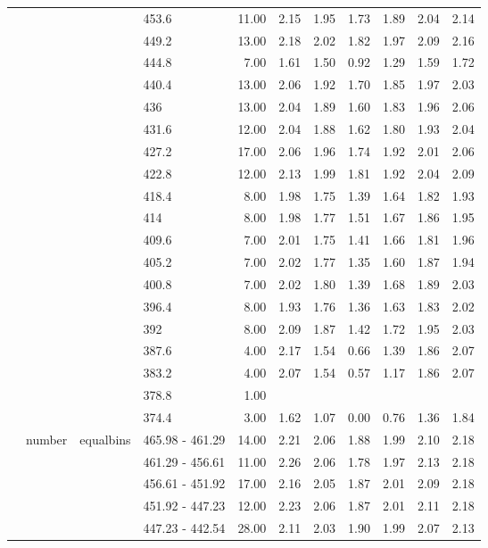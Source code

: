 \begin{longtable}{llllrrrrrrr}
   &  &  & 453.6 & 11.00 & 2.15 & 1.95 & 1.73 & 1.89 & 2.04 & 2.14 \\ 
   &  &  & 449.2 & 13.00 & 2.18 & 2.02 & 1.82 & 1.97 & 2.09 & 2.16 \\ 
   &  &  & 444.8 & 7.00 & 1.61 & 1.50 & 0.92 & 1.29 & 1.59 & 1.72 \\ 
   &  &  & 440.4 & 13.00 & 2.06 & 1.92 & 1.70 & 1.85 & 1.97 & 2.03 \\ 
   &  &  & 436 & 13.00 & 2.04 & 1.89 & 1.60 & 1.83 & 1.96 & 2.06 \\ 
   &  &  & 431.6 & 12.00 & 2.04 & 1.88 & 1.62 & 1.80 & 1.93 & 2.04 \\ 
   &  &  & 427.2 & 17.00 & 2.06 & 1.96 & 1.74 & 1.92 & 2.01 & 2.06 \\ 
   &  &  & 422.8 & 12.00 & 2.13 & 1.99 & 1.81 & 1.92 & 2.04 & 2.09 \\ 
   &  &  & 418.4 & 8.00 & 1.98 & 1.75 & 1.39 & 1.64 & 1.82 & 1.93 \\ 
   &  &  & 414 & 8.00 & 1.98 & 1.77 & 1.51 & 1.67 & 1.86 & 1.95 \\ 
   &  &  & 409.6 & 7.00 & 2.01 & 1.75 & 1.41 & 1.66 & 1.81 & 1.96 \\ 
   &  &  & 405.2 & 7.00 & 2.02 & 1.77 & 1.35 & 1.60 & 1.87 & 1.94 \\ 
   &  &  & 400.8 & 7.00 & 2.02 & 1.80 & 1.39 & 1.68 & 1.89 & 2.03 \\ 
   &  &  & 396.4 & 8.00 & 1.93 & 1.76 & 1.36 & 1.63 & 1.83 & 2.02 \\ 
   &  &  & 392 & 8.00 & 2.09 & 1.87 & 1.42 & 1.72 & 1.95 & 2.03 \\ 
   &  &  & 387.6 & 4.00 & 2.17 & 1.54 & 0.66 & 1.39 & 1.86 & 2.07 \\ 
   &  &  & 383.2 & 4.00 & 2.07 & 1.54 & 0.57 & 1.17 & 1.86 & 2.07 \\ 
   &  &  & 378.8 & 1.00 &  &  &  &  &  &  \\ 
   &  &  & 374.4 & 3.00 & 1.62 & 1.07 & 0.00 & 0.76 & 1.36 & 1.84 \\ 
   & number & equalbins & 465.98 - 461.29 & 14.00 & 2.21 & 2.06 & 1.88 & 1.99 & 2.10 & 2.18 \\ 
   &  &  & 461.29 - 456.61 & 11.00 & 2.26 & 2.06 & 1.78 & 1.97 & 2.13 & 2.18 \\ 
   &  &  & 456.61 - 451.92 & 17.00 & 2.16 & 2.05 & 1.87 & 2.01 & 2.09 & 2.18 \\ 
   &  &  & 451.92 - 447.23 & 12.00 & 2.23 & 2.06 & 1.87 & 2.01 & 2.11 & 2.18 \\ 
   &  &  & 447.23 - 442.54 & 28.00 & 2.11 & 2.03 & 1.90 & 1.99 & 2.07 & 2.13 \\ 

\end{longtable}

